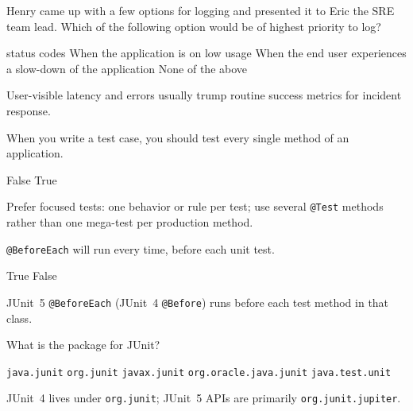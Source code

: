 


\question[4]
Henry came up with a few options for logging and presented it to Eric the SRE team lead. Which of the following option would be of highest priority to log?
\begin{choices}
   status codes
  \choice When the application is on low usage
  \CorrectChoice When the end user experiences a slow-down of the application
  \choice None of the above
\end{choices}
\begin{solution}
  User-visible latency and errors usually trump routine success metrics for incident response.
\end{solution}

\question[4]
When you write a test case, you should test every single method of an application.
\begin{choices}
  \CorrectChoice False
  \choice True
\end{choices}
\begin{solution}
  Prefer focused tests: one behavior or rule per test; use several \texttt{@Test} methods rather than one mega-test per production method.
\end{solution}

\question[4]
\texttt{@BeforeEach} will run every time, before each unit test.
\begin{choices}
  \CorrectChoice True
  \choice False
\end{choices}
\begin{solution}
  JUnit~5 \texttt{@BeforeEach} (JUnit~4 \texttt{@Before}) runs before each test method in that class.
\end{solution}

\question[4]
What is the package for JUnit?
\begin{choices}
  \choice \texttt{java.junit}
  \CorrectChoice \texttt{org.junit}
  \choice \texttt{javax.junit}
  \choice \texttt{org.oracle.java.junit}
  \choice \texttt{java.test.unit}
\end{choices}
\begin{solution}
  JUnit~4 lives under \texttt{org.junit}; JUnit~5 APIs are primarily \texttt{org.junit.jupiter}.
\end{solution}

